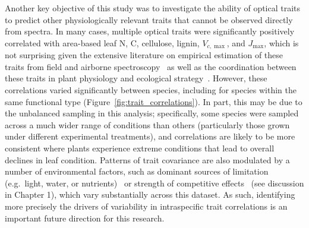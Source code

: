 Another key objective of this study was to investigate the ability of optical traits to predict other physiologically relevant traits that cannot be observed directly from spectra.
In many cases, multiple optical traits were significantly positively correlated with area-based leaf N, C, cellulose, lignin, $V_{c,\max}$, and $J_{\max}$,
which is not surprising given the extensive literature on empirical estimation of these traits from field and airborne spectroscopy~\cite{serbin_2011_leaf,serbin_spectroscopic_2014,asner_2015_quantifying,cavenderbares_2017_harnessing}
as well as the coordination between these traits in plant physiology and ecological strategy~\cite{kitajima_2003_increases,onoda_physiological_2017,croft_2017_chlorophyll}.
However, these correlations varied significantly between species, including for species within the same functional type (Figure~\ref{fig:trait_correlations}).
In part, this may be due to the unbalanced sampling in this analysis;
specifically, some species were sampled across a much wider range of conditions than others (particularly those grown under different experimental treatments), and correlations are likely to be more consistent where plants experience extreme conditions that lead to overall declines in leaf condition.
Patterns of trait covariance are also modulated by a number of environmental factors, such as dominant sources of limitation (e.g.\ light, water, or nutrients)~\cite{borgy_2017_plant} or strength of competitive effects~\cite{kunstler2016_competition} (see discussion in Chapter 1), which vary substantially across this dataset.
As such, identifying more precisely the drivers of variability in intraspecific trait correlations is an important future direction for this research.
